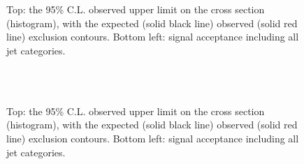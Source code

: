 \newpage
\begin{figure}[h!]
    \begin{center}
         \\
         ~~
        \caption{Top: the 95\% C.L. observed upper limit on the cross section
            (histogram), with the expected (solid black line) observed
            (solid red line) exclusion contours. Bottom left: signal acceptance
            including all jet categories.}
        \label{fig:T2cc}
    \end{center}
\end{figure}

\newpage
\begin{figure}[h!]
    \begin{center}
         \\
         ~~
        \caption{Top: the 95\% C.L. observed upper limit on the cross section
            (histogram), with the expected (solid black line) observed
            (solid red line) exclusion contours. Bottom left: signal acceptance
            including all jet categories.}
        \label{fig:T2bb}
    \end{center}
\end{figure}

